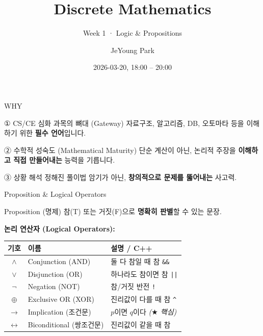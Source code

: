 \documentclass[10.5pt,compress]{beamer}
\title{Discrete Mathematics}
\subtitle{Week 1 · Logic \& Propositions}
\author{JeYoung Park}
\institute{SeoulTech CS\&CE}
\date{2026-03-20, 18:00 -- 20:00}
\begin{document}
\begin{frame}
    \titlepage
\end{frame}

\begin{frame}[t]{WHY}
    \small
    \begin{block}{① CS/CE 심화 과목의 뼈대 (Gateway)}
        자료구조, 알고리즘, DB, 오토마타 등을 이해하기 위한 \textbf{필수 언어}입니다.
    \end{block}
    \vspace{0.12cm}
    \begin{block}{② 수학적 성숙도 (Mathematical Maturity)}
        단순 계산이 아닌, 논리적 주장을 \textbf{이해하고 직접 만들어내는} 능력을 기릅니다.
    \end{block}
    \vspace{0.12cm}
    \begin{block}{③ 상황 해석}
        정해진 풀이법 암기가 아닌, \textbf{창의적으로 문제를 뚫어내는} 사고력.
    \end{block}
\end{frame}

\begin{frame}[t]{Proposition \& Logical Operators}
    \footnotesize
    \begin{alertblock}{Proposition (명제)}
        참(T) 또는 거짓(F)으로 \textbf{명확히 판별}할 수 있는 문장.
    \end{alertblock}
    \vspace{0.1cm}
    \textbf{논리 연산자 (Logical Operators):}
    \begin{center}
    \scriptsize
    \begin{tabular}{cll}
        \toprule
        \textbf{기호} & \textbf{이름} & \textbf{설명 / C++} \\
        \midrule
        $\land$ & Conjunction (AND) & 둘 다 참일 때 참 \quad \texttt{\&\&} \\
        $\lor$  & Disjunction (OR)  & 하나라도 참이면 참 \quad \texttt{||} \\
        $\neg$  & Negation (NOT)    & 참/거짓 반전 \quad \texttt{!} \\
        $\oplus$ & Exclusive OR (XOR) & 진리값이 다를 때 참 \quad \texttt{\^{}} \\
        $\rightarrow$ & Implication (조건문) & $p$이면 $q$이다 \quad \textit{($\bigstar$ 핵심)} \\
        $\leftrightarrow$ & Biconditional (쌍조건문) & 진리값이 같을 때 참 \\
        \bottomrule
    \end{tabular}
    \end{center}
\end{frame}
\end{document}

